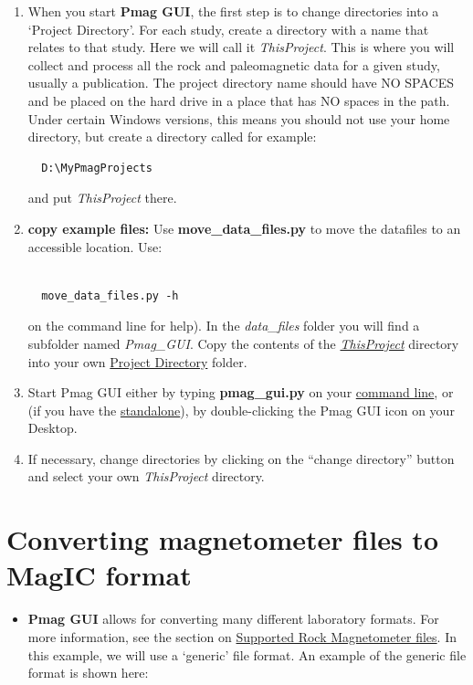 \documentclass[11pt]{book}
\begin{document}
{{\begin{enumerate}
\item  When you start {\bf Pmag GUI}, the first step is to change directories into a  `Project Directory'. For each study, create a directory with a name that relates to that study. Here we will call it {\it ThisProject}.  This is where you will collect and process all the rock and paleomagnetic data for a given study, usually a publication. The project directory name should have NO SPACES and be placed on the hard drive in a place that has NO spaces in the path. Under certain Windows versions, this means you should not use your home directory, but create a directory called for example:\begin{verbatim}
  D:\MyPmagProjects\end{verbatim} and put {\it ThisProject} there.
%
%
%


\item \textbf{copy example files:}  Use \textbf{move\_data\_files.py} to move the  datafiles to an accessible location.  Use: \begin{verbatim}

  move_data_files.py -h\end{verbatim} on the command line for help).  In the {\it data\_files } folder you will find a subfolder named {\it Pmag\_GUI}. Copy the contents of the  \href{#Project_Directory}{\it ThisProject} directory  into  your  own \href{#Project_Directory}{Project Directory} folder.
 \item Start Pmag GUI either by typing {\bf pmag\_gui.py} on your \href{#command_line}{command line}, or (if you have the \href{#standalone}{standalone}), by double-clicking the Pmag GUI icon on your Desktop.
 \item If necessary, change directories by clicking  on the ``change directory'' button and select your own {\it ThisProject} directory.
 \end{enumerate}


\section{Converting magnetometer files to MagIC format}
\begin{itemize}
\item {\bf Pmag GUI} allows for converting many different laboratory formats.  For more information, see the section on \href{#magnetometer_files}{Supported Rock Magnetometer files}.   In this example, we will use a `generic' file format.
An example of the generic file format is shown here:


\end{itemize}}}
\end{document}
